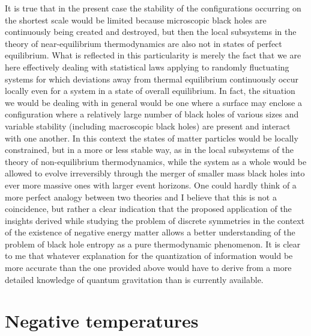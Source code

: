 \documentclass[notitlepage,12pt]{report}
\begin{document}
It is true that in the present case the stability of the configurations occurring on the shortest scale would be limited because microscopic black holes are continuously being created and destroyed, but then the local subsystems in the theory of near-equilibrium thermodynamics are also not in states of perfect equilibrium. What is reflected in this particularity is merely the fact that we are here effectively dealing with statistical laws applying to randomly fluctuating systems for which deviations away from thermal equilibrium continuously occur locally even for a system in a state of overall equilibrium. In fact, the situation we would be dealing with in general would be one where a surface may enclose a configuration where a relatively large number of black holes of various sizes and variable stability (including macroscopic black holes) are present and interact with one another. In this context the states of matter particles would be locally constrained, but in a more or less stable way, as in the local subsystems of the theory of non-equilibrium thermodynamics, while the system as a whole would be allowed to evolve irreversibly through the merger of smaller mass black holes into ever more massive ones with larger event horizons. One could hardly think of a more perfect analogy between two theories and I believe that this is not a coincidence, but rather a clear indication that the proposed application of the insights derived while studying the problem of discrete symmetries in the context of the existence of negative energy matter allows a better understanding of the problem of black hole entropy as a pure thermodynamic phenomenon. It is clear to me that whatever explanation for the quantization of information would be more accurate than the one provided above would have to derive from a more detailed knowledge of quantum gravitation than is currently available.

\section{Negative temperatures}
\end{document}
